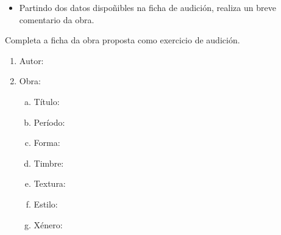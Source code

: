 \begin{ejercicio}[]
\begin{itemize}
    \item
    Partindo dos datos dispoñibles na ficha de audición, realiza un breve comentario da obra.
    \vspace*{12cm}
	\end{itemize}

\end{ejercicio}
%
%
\begin{ejercicio}[]
%
Completa a ficha da obra proposta como exercicio de audición.
%
\begin{multicols}{2}
	\begin{enumerate}[1.-]
        \vspace*{0.3cm}
		\item
			Autor: \dotfill
			\vspace*{0.3cm}
		\item
			Obra:
			\begin{enumerate}[a)]
			    \item Título: \dotfill \vspace*{0.3cm}
			    \item Período: \dotfill \vspace*{0.3cm}
			    \item Forma: \dotfill \vspace*{0.3cm}
			    \item Timbre: \dotfill \vspace*{0.3cm} 		
			    \item Textura: \dotfill \vspace*{0.3cm}
			    \item Estilo: \dotfill \vspace*{0.3cm}
			    \item Xénero: \dotfill \vspace*{0.3cm}
			\end{enumerate}

	\end{enumerate}
\end{multicols}
	\begin{itemize}
    
    

\end{itemize}
\end{ejercicio}
